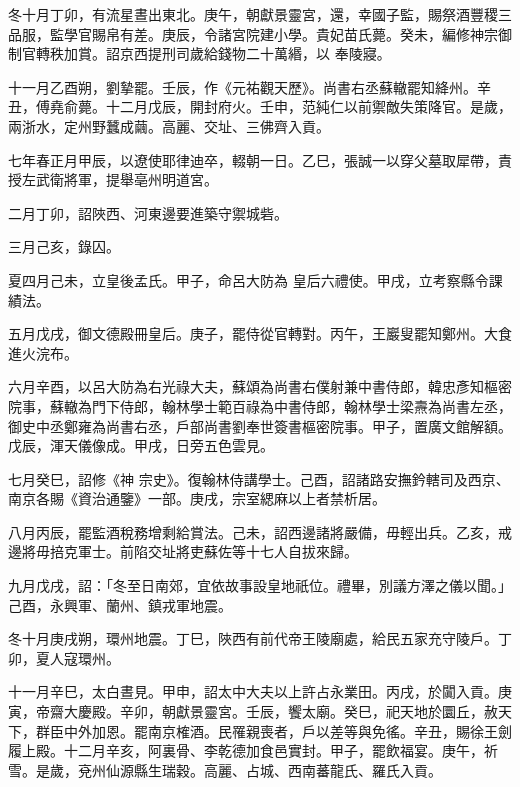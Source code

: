 \begin{pinyinscope}
 冬十月丁卯，有流星晝出東北。庚午，朝獻景靈宮，還，幸國子監，賜祭酒豐稷三品服，監學官賜帛有差。庚辰，令諸宮院建小學。貴妃苗氏薨。癸未，編修神宗御制官轉秩加賞。詔京西提刑司歲給錢物二十萬緡，以
 奉陵寢。



 十一月乙酉朔，劉摯罷。壬辰，作《元祐觀天歷》。尚書右丞蘇轍罷知絳州。辛丑，傅堯俞薨。十二月戊辰，開封府火。壬申，范純仁以前禦敵失策降官。是歲，兩浙水，定州野蠶成繭。高麗、交址、三佛齊入貢。



 七年春正月甲辰，以遼使耶律迪卒，輟朝一日。乙巳，張誠一以穿父墓取犀帶，責授左武衛將軍，提舉亳州明道宮。



 二月丁卯，詔陜西、河東邊要進築守禦城砦。



 三月己亥，錄囚。



 夏四月己未，立皇後孟氏。甲子，命呂大防為
 皇后六禮使。甲戌，立考察縣令課績法。



 五月戊戌，御文德殿冊皇后。庚子，罷侍從官轉對。丙午，王巖叟罷知鄭州。大食進火浣布。



 六月辛酉，以呂大防為右光祿大夫，蘇頌為尚書右僕射兼中書侍郎，韓忠彥知樞密院事，蘇轍為門下侍郎，翰林學士範百祿為中書侍郎，翰林學士梁燾為尚書左丞，御史中丞鄭雍為尚書右丞，戶部尚書劉奉世簽書樞密院事。甲子，置廣文館解額。戊辰，渾天儀像成。甲戌，日旁五色雲見。



 七月癸巳，詔修《神
 宗史》。復翰林侍講學士。己酉，詔諸路安撫鈐轄司及西京、南京各賜《資治通鑒》一部。庚戌，宗室緦麻以上者禁析居。



 八月丙辰，罷監酒稅務增剩給賞法。己未，詔西邊諸將嚴備，毋輕出兵。乙亥，戒邊將毋掊克軍士。前陷交址將吏蘇佐等十七人自拔來歸。



 九月戊戌，詔：「冬至日南郊，宜依故事設皇地祇位。禮畢，別議方澤之儀以聞。」己酉，永興軍、蘭州、鎮戎軍地震。



 冬十月庚戌朔，環州地震。丁巳，陜西有前代帝王陵廟處，給民五家充守陵戶。丁
 卯，夏人寇環州。



 十一月辛巳，太白晝見。甲申，詔太中大夫以上許占永業田。丙戌，於闐入貢。庚寅，帝齋大慶殿。辛卯，朝獻景靈宮。壬辰，饗太廟。癸巳，祀天地於圜丘，赦天下，群臣中外加恩。罷南京榷酒。民罹親喪者，戶以差等與免徭。辛丑，賜徐王劍履上殿。十二月辛亥，阿裏骨、李乾德加食邑實封。甲子，罷飲福宴。庚午，祈雪。是歲，兗州仙源縣生瑞穀。高麗、占城、西南蕃龍氏、羅氏入貢。




\end{pinyinscope}
